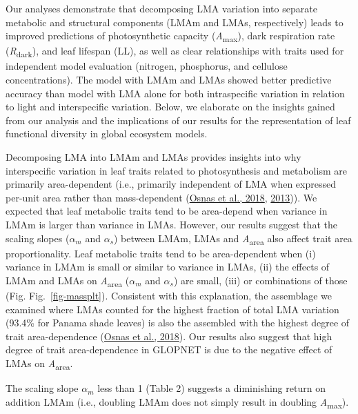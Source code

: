 \documentclass[
  12pt,
  a4paper,
,tablecaptionabove
]{scrartcl}
\begin{document}
Our analyses demonstrate that decomposing LMA variation into separate
metabolic and structural components (LMAm and LMAs, respectively) leads
to improved predictions of photosynthetic capacity
(\emph{A}\textsubscript{max}), dark respiration rate
(\emph{R}\textsubscript{dark}), and leaf lifespan (LL), as well as clear
relationships with traits used for independent model evaluation
(nitrogen, phosphorus, and cellulose concentrations). The model with
LMAm and LMAs showed better predictive accuracy than model with LMA
alone for both intraspecific variation in relation to light and
interspecific variation. Below, we elaborate on the insights gained from
our analysis and the implications of our results for the representation
of leaf functional diversity in global ecosystem models.

Decomposing LMA into LMAm and LMAs provides insights into why
interspecific variation in leaf traits related to photosynthesis and
metabolism are primarily area-dependent (i.e., primarily independent of
LMA when expressed per-unit area rather than mass-dependent
(\protect\hyperlink{ref-Osnas2018}{Osnas et al., 2018},
\protect\hyperlink{ref-Osnas2013}{2013})). We expected that leaf
metabolic traits tend to be area-depend when variance in LMAm is larger
than variance in LMAs. However, our results suggest that the scaling
slopes (\(\alpha_m\) and \(\alpha_s\)) between LMAm, LMAs and
\emph{A}\textsubscript{area} also affect trait area proportionality.
Leaf metabolic traits tend to be area-dependent when (i) variance in
LMAm is small or similar to variance in LMAs, (ii) the effects of LMAm
and LMAs on \emph{A}\textsubscript{area} (\(\alpha_m\) and \(\alpha_s\))
are small, (iii) or combinations of those (Fig. Fig.~\ref{fig-massplt}).
Consistent with this explanation, the assemblage we examined where LMAs
counted for the highest fraction of total LMA variation (93.4\% for
Panama shade leaves) is also the assembled with the highest degree of
trait area-dependence (\protect\hyperlink{ref-Osnas2018}{Osnas et al.,
2018}). Our results also suggest that high degree of trait
area-dependence in GLOPNET is due to the negative effect of LMAs on
\emph{A}\textsubscript{area}.

The scaling slope \(\alpha_m\) less than 1 (Table 2) suggests a
diminishing return on addition LMAm (i.e., doubling LMAm does not simply
result in doubling \emph{A}\textsubscript{max}).
\end{document}
